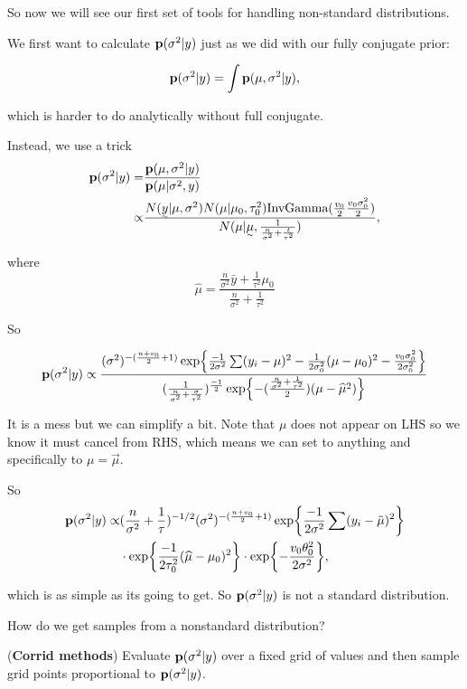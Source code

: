 So now we will see our first set of tools for handling non-standard distributions.

We first want to calculate ${\mathbf p}(\sigma^2|y)$ just as we did with our fully conjugate prior:

\[
{\mathbf p}(\sigma^2| y) = \int {\mathbf p}(\mu, \sigma^2| y),
\]

which is harder to do analytically without full conjugate.

Instead, we use a trick 
\begin{align*}
    \p(\sigma^2|y)
    =& \frac{\p(\mu, \sigma^2|y)}{\p(\mu| \sigma^2, y)}\\
    \propto&
    \frac{N(\vec{y}| \mu, \sigma^2) N(\mu| \mu_0, \tau_0^2) \text{InvGamma}(\frac{v_0}{2} \frac{v_0 \sigma^2_0}{2})}{N(\mu| \vec{\mu}, \frac{1}{\frac{n}{\sigma^2} + \frac{t}{\tau^2}})},
\end{align*}

where
\[
\hat{\mu} = \frac{\frac{n}{\sigma^2} \bar{y} + \frac{1}{\tau^2} \mu_0}{\frac{n}{\sigma^2} + \frac{1}{\tau^2}}
\]

So 

\[
{\mathbf p}(\sigma^2| y) \propto 
\frac{
    (\sigma^2)^{-(\frac{n+v_0}{2} + 1)} 
    \exp{\frac{-1}{2\sigma^2} \sum(y_i - \mu)^2 
    - \frac{1}{2\sigma^2_0}(\mu - \mu_0)^2 
    - \frac{v_0\sigma_0^2}{2\sigma_0^2}}
}{
    (\frac{1}{\frac{n}{\sigma^2} + \frac{\sigma}{\tau^2}})^{\frac{-1}{2}} 
    \exp{-(\frac{\frac{n}{\sigma^2} + \frac{1}{\tau^2}}{2}) (\mu - \widehat{\mu}^2)}
}
\]

It is a mess but we can simplify a bit. Note that $\mu$ does not appear on LHS so we know it must cancel from RHS, which means we can set to anything and specifically to $\mu = \vec{\mu}$.

So 
\begin{align*}
{\mathbf p}(\sigma^2| y) 
\propto & 
(\frac{n}{\sigma^2} + \frac{1}{\tau})^{-1/2} (\sigma^2)^{-(\frac{n+v_0}{2} + 1)} \exp{\frac{-1}{2\sigma^2}\sum(y_i - \Tilde{\mu})^2}\\
&\cdot \exp{\frac{-1}{2\tau_0^2} (\widehat\mu - \mu_0)^2} \cdot \exp{-\frac{v_0 \theta_0^2}{2 \sigma^2}},
\end{align*}

which is as simple as its going to get. So ${\mathbf p}(\sigma^2|y)$ is not a standard distribution.

How do we get samples from a nonstandard distribution?

\begin{definition}
(\textbf{Corrid methods}) Evaluate ${\mathbf p}(\sigma^2|y)$ over a fixed grid of values and then sample grid points proportional to ${\mathbf p}(\sigma^2|y)$.
\end{definition}

